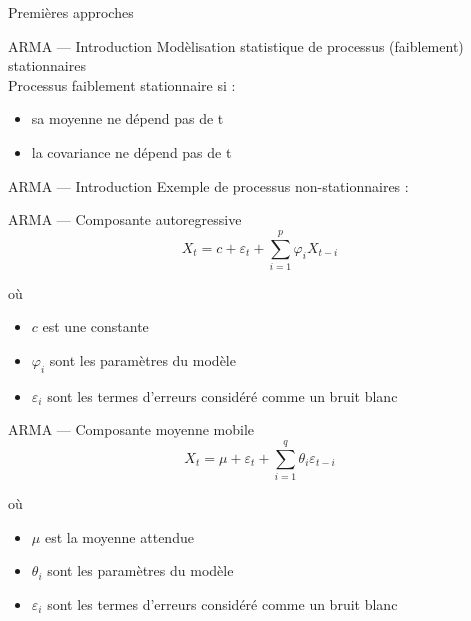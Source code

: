 \begin{frame}{Premières approches }
\end{frame}

\begin{frame}{ARMA --- Introduction}
  Modèlisation statistique de processus (faiblement) stationnaires \\
  \newline
  Processus faiblement stationnaire si :
  \begin{itemize}
    \item sa moyenne ne dépend pas de t
    \item la covariance ne dépend pas de t
  \end{itemize}
\end{frame}

\begin{frame}{ARMA --- Introduction}
  Exemple de processus non-stationnaires :
\end{frame}

\begin{frame}{ARMA --- Composante autoregressive}
  \[
  X_{t}=c+\varepsilon _{t}+\sum _{i=1}^{p}\varphi _{i}X_{t-i}
  \]

  où

  \begin{itemize}
    \item $c$ est une constante
    \item $\varphi_i$ sont les paramètres du modèle
    \item $\varepsilon_i$ sont les termes d'erreurs considéré comme un bruit blanc
  \end{itemize}
\end{frame}

\begin{frame}{ARMA --- Composante moyenne mobile}
  \[
  X_{t}=\mu +\varepsilon _{t}+\sum _{i=1}^{q}\theta _{i}\varepsilon _{t-i}
  \]

  où

  \begin{itemize}
    \item $\mu$ est la moyenne attendue
    \item $\theta_i$ sont les paramètres du modèle
    \item $\varepsilon_i$ sont les termes d'erreurs considéré comme un bruit blanc
  \end{itemize}
\end{frame}

